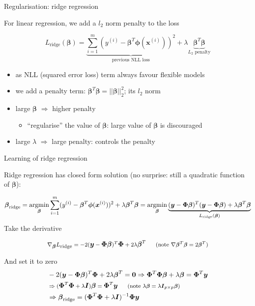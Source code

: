 \documentclass[ignorenonframetext,aspectratio=169]{beamer}
\providecommand{\tightlist}{%
  \setlength{\itemsep}{0pt}\setlength{\parskip}{0pt}}
\newcommand{\vv}[1]{\boldsymbol{#1}}
\newcommand{\argmin}{\operatornamewithlimits{argmin}}
\newcommand{\dd}[1]{\ensuremath{ #1^{(i)}}}
\newcommand{\Di}[2]{\ensuremath{ \vv{#1}^{(#2)}}}
\begin{document}
\begin{frame}{Regularisation: ridge regression}
\protect\hypertarget{regularisation-ridge-regression}{}

For linear regression, we add a \(l_2\) norm penalty to the loss

\[L_{\text{ridge}}(\vv{\beta}) = \underbrace{\sum_{i=1}^m (\dd{y}  - \vv{\beta}^T\vv{\phi}(\Di{x}{i}))^2}_{\text{previous NLL loss}} + \lambda \underbrace{\vv{\beta}^T\vv{\beta}}_{L_2 \text{ penalty}}\]

\begin{itemize}
\tightlist
\item
  as NLL (squared error loss) term always favour flexible models
\item
  we add a penalty term:
  \(\vv{\beta}^T\vv{\beta} = ||\vv{\beta}||_2^2\); its \(l_2\) norm
\item
  large \(\vv{\beta}\) \(\Rightarrow\) higher penalty

  \begin{itemize}
  \tightlist
  \item
    ``regularise'' the value of \(\vv{\beta}\): large value of
    \(\vv{\beta}\) is discouraged
  \end{itemize}
\item
  large \(\lambda\) \(\Rightarrow\) large penalty: controls the penalty
\end{itemize}

\end{frame}

\begin{frame}{Learning of ridge regression}
\protect\hypertarget{learning-of-ridge-regression}{}

Ridge regression has closed form solution (no surprise: still a
quadratic function of \(\vv{\beta}\)):

\[ \vv{\beta}_{\text{ridge}} = \argmin_{\vv{\beta}} \sum_{i=1}^m (\dd{y}  - \vv{\beta}^T\vv{\phi}(\Di{x}{i}))^2 + \lambda \vv{\beta}^T\vv{\beta}=  \argmin_{\vv{\beta}} \underbrace{(\vv{y}-\vv{\Phi\beta})^T(\vv{y}-\vv{\Phi\beta}) + \lambda \vv{\beta}^T\vv{\beta}}_{L_{\text{ridge}}(\vv{\beta})}\]
Take the derivative

\begin{align*}
\nabla_{\vv{\beta}} L_{\text{ridge}}= -2(\vv{y}-\vv{\Phi\beta})^T\vv{\Phi} + 2\lambda \vv{\beta}^T\;\;\;\;\;\; (\footnotesize \text{note } \nabla \vv{\beta}^T\vv{\beta} = 2\vv{\beta}^T)
\end{align*}

And set it to zero \begin{align*}
&-2(\vv{y}-\vv{\Phi\beta})^T\vv{\Phi} + 2\lambda \vv{\beta}^T ={\vv{0}} \Rightarrow \vv{\Phi}^T\vv{\Phi}\vv{\beta} + \lambda \vv{\beta} = \vv{\Phi}^T\vv{y} \\
&\Rightarrow (\vv{\Phi}^T\vv{\Phi} + \lambda\vv{I}) \vv{\beta} = \vv{\Phi}^T\vv{y}\;\;\;\;\;\; (\footnotesize \text{note } \lambda \vv{\beta} = \lambda\vv{I}_{p\times p}\vv{\beta}) \\
&\Rightarrow \vv{\beta}_{\text{ridge}} = (\vv{\Phi}^T\vv{\Phi} + \lambda\vv{I})^{-1}\vv{\Phi}\vv{y}
\end{align*}

\end{frame}
\end{document}
